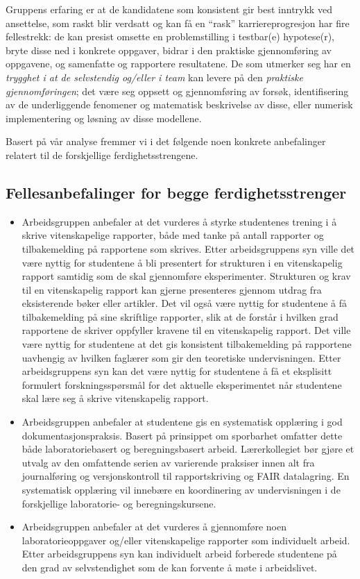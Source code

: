 \documentclass{article}
\begin{document}
Gruppens erfaring er at de kandidatene som konsistent gir best inntrykk ved ansettelse, som raskt blir verdsatt og kan få en ``rask'' karriereprogresjon har fire fellestrekk: de kan presist omsette en problemstilling i testbar(e) hypotese(r), bryte disse ned i konkrete oppgaver, bidrar i den praktiske gjennomføring av oppgavene, og samenfatte og rapportere resultatene. De som utmerker seg har en \emph{trygghet i at de selvstendig og/eller i team} kan levere på den \emph{praktiske gjennomføringen}; det være seg oppsett og gjennomføring av forsøk, identifisering av de underliggende fenomener og matematisk beskrivelse av disse, eller numerisk implementering og løsning av disse modellene.

Basert på vår analyse fremmer vi i det følgende noen konkrete anbefalinger relatert til de forskjellige ferdighetsstrengene.

\subsection{Fellesanbefalinger for begge ferdighetsstrenger}
\begin{itemize}
  \item Arbeidsgruppen anbefaler at det vurderes å styrke studentenes trening i å skrive vitenskapelige rapporter, både med tanke på antall rapporter og tilbakemelding på rapportene som skrives. Etter arbeidsgruppens syn ville det være nyttig for studentene å bli presentert for strukturen i en vitenskapelig rapport samtidig som de skal gjennomføre eksperimenter. Strukturen og krav til en vitenskapelig rapport kan gjerne presenteres gjennom utdrag fra eksisterende bøker eller artikler. Det vil også være nyttig for studentene å få tilbakemelding på sine skriftlige rapporter, slik at de forstår i hvilken grad rapportene de skriver oppfyller kravene til en vitenskapelig rapport. Det ville være nyttig for studentene at det gis konsistent tilbakemelding på rapportene uavhengig av hvilken faglærer som gir den teoretiske undervisningen. Etter arbeidsgruppens syn kan det være nyttig for studentene å få et eksplisitt formulert forskningsspørsmål for det aktuelle eksperimentet når studentene skal lære seg å skrive vitenskapelig rapport.

  \item Arbeidsgruppen anbefaler at studentene gis en systematisk opplæring i god dokumentasjonspraksis. Basert på prinsippet om sporbarhet omfatter dette både laboratoriebasert og beregningsbasert arbeid. Lærerkollegiet bør gjøre et utvalg av den omfattende serien av varierende praksiser innen alt fra journalføring og versjonskontroll til rapportskriving og FAIR datalagring. En systematisk opplæring vil innebære en koordinering av undervisningen i de forskjellige laboratorie- og beregningskursene.

  \item Arbeidsgruppen anbefaler at det vurderes å gjennomføre noen laboratorieoppgaver og/eller vitenskapelige rapporter som individuelt arbeid. Etter arbeidsgruppens syn kan individuelt arbeid forberede studentene på den grad av selvstendighet som de kan forvente å møte i arbeidslivet.
\end{itemize}
\end{document}
